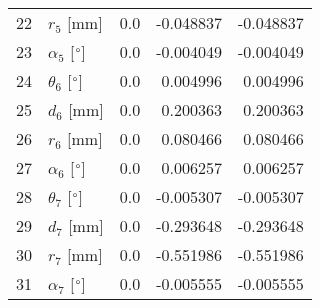 \documentclass{standalone}%
\begin{document}
\begin{tabular}{llrrr}
22 &              $r_{5}$ [mm] &       0.0 &  -0.048837 &  -0.048837 \\
23 &  $\alpha_{5}$ [$\degree$] &       0.0 &  -0.004049 &  -0.004049 \\
24 &  $\theta_{6}$ [$\degree$] &       0.0 &   0.004996 &   0.004996 \\
25 &              $d_{6}$ [mm] &       0.0 &   0.200363 &   0.200363 \\
26 &              $r_{6}$ [mm] &       0.0 &   0.080466 &   0.080466 \\
27 &  $\alpha_{6}$ [$\degree$] &       0.0 &   0.006257 &   0.006257 \\
28 &  $\theta_{7}$ [$\degree$] &       0.0 &  -0.005307 &  -0.005307 \\
29 &              $d_{7}$ [mm] &       0.0 &  -0.293648 &  -0.293648 \\
30 &              $r_{7}$ [mm] &       0.0 &  -0.551986 &  -0.551986 \\
31 &  $\alpha_{7}$ [$\degree$] &       0.0 &  -0.005555 &  -0.005555 \\
\bottomrule
\end{tabular}
%
\end{document}
